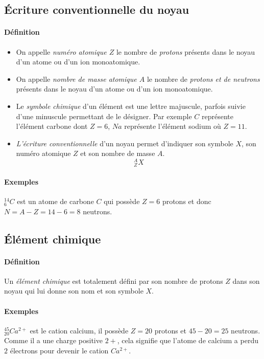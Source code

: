 \subsection{Écriture conventionnelle du noyau}
\paragraph{Définition}
\begin{itemize} 
  \item  On appelle \textit{numéro atomique $Z$} le nombre de \textit{protons}
  présents dans le noyau d'un atome ou d'un ion monoatomique.
  \item On appelle \textit{nombre de masse atomique $A$} le nombre de \textit{protons 
  et de neutrons} présents dans le noyau d'un atome ou d'un ion monoatomique.
  \item Le \textit{symbole chimique} d'un élément est une lettre majuscule, parfois 
  suivie d'une minuscule permettant de le désigner. Par exemple $C$ représente l'élément carbone dont $Z=6$,
  $Na$ représente l'élément sodium où $Z=11$. 
  \item \textit{L'écriture conventionnelle} d'un noyau permet d'indiquer
  son symbole $X$, son numéro atomique $Z$ et son nombre de masse $A$. $$ ^A_Z X $$
\end{itemize}


\paragraph{Exemples} $ ^{14}_{6} C $ est un atome de carbone $C$ qui possède $Z=6$ protons et donc $N=A-Z=14-6=8$ neutrons.


\subsection{Élément chimique}
\paragraph{Définition} Un \textit{élément chimique} est totalement défini par son nombre de protons $Z$ 
dans son noyau qui lui donne son nom et son symbole $X$.
\paragraph{Exemples}$ ^{45}_{20} Ca^{2+} $ est le cation calcium, il possède $Z=20$ protons 
et $45-20=25$ neutrons. Comme il a une charge positive $2+$, cela signifie que l'atome de calcium 
a perdu $2$ électrons pour devenir le cation $Ca^{2+}$.

